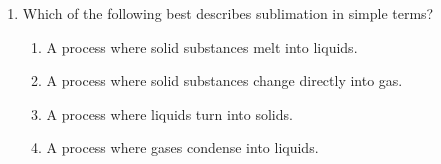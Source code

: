 \documentclass[12pt]{article}
\begin{document}
\begin{enumerate}
\vspace{0.5cm}

\item Which of the following best describes sublimation in simple terms?
\begin{enumerate}[label=\Alph*.]
    \item A process where solid substances melt into liquids.
    \item A process where solid substances change directly into gas.
    \item A process where liquids turn into solids.
    \item A process where gases condense into liquids.
\end{enumerate}

\end{enumerate}
\end{document}
